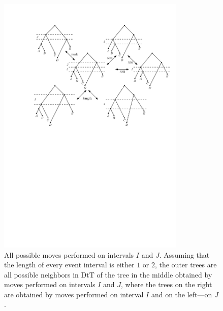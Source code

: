 \documentclass[11pt]{amsart}
\theoremstyle{definition}
\newcommand{\dtt}{\mathrm{DtT}}
\begin{document}
\begin{figure}[ht]
\centering
\includegraphics[width=0.8\textwidth]{DtT_with_rank_move_short}
\caption{All possible moves performed on intervals $I$ and $J$.
Assuming that the length of every event interval is either $1$ or $2$, the outer trees are all possible neighbors in $\dtt$ of the tree in the middle obtained by moves performed on intervals $I$ and $J$, where the trees on the right are obtained by moves performed on interval $I$ and on the left---on $J$.}
\label{DtT.pdf}
\end{figure}
\end{document}
